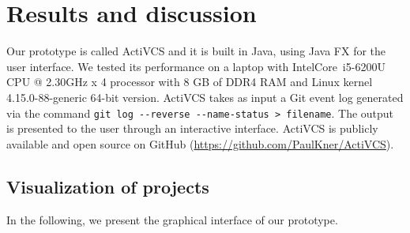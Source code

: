\section{Results and discussion}
\label{sec:results}

Our prototype is called ActiVCS and it is built in Java, using Java FX for the user interface. We tested its performance on a laptop with Intel\textregistered Core\texttrademark~i5-6200U CPU @ 2.30GHz x 4 processor with 8 GB of DDR4 RAM and Linux kernel 4.15.0-88-generic 64-bit version. ActiVCS takes as input a Git event log generated via the command 
\lstinline{git log --reverse --name-status > filename}. The output is presented to the user through an interactive interface. ActiVCS is publicly available and open source on GitHub (\url{https://github.com/PaulKner/ActiVCS}).

\subsection{Visualization of projects}

In the following, we present the graphical interface of our prototype. 

